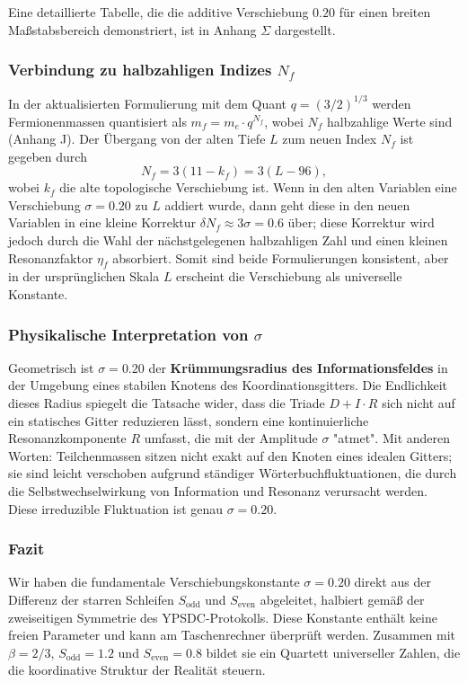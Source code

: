 \documentclass[12pt,a4paper]{article}
\begin{document}
	Eine detaillierte Tabelle, die die additive Verschiebung \(0.20\) für einen breiten Maßstabsbereich demonstriert, ist in Anhang \(\Sigma\) dargestellt.
	
	\subsubsection{Verbindung zu halbzahligen Indizes \(N_f\)}
	
	In der aktualisierten Formulierung mit dem Quant \(q = (3/2)^{1/3}\) werden Fermionenmassen quantisiert als \(m_f = m_e \cdot q^{N_f}\), wobei \(N_f\) halbzahlige Werte sind (Anhang J). Der Übergang von der alten Tiefe \(L\) zum neuen Index \(N_f\) ist gegeben durch
	\[
	N_f = 3(11 - k_f) = 3(L - 96),
	\]
	wobei \(k_f\) die alte topologische Verschiebung ist. Wenn in den alten Variablen eine Verschiebung \(\sigma = 0.20\) zu \(L\) addiert wurde, dann geht diese in den neuen Variablen in eine kleine Korrektur \(\delta N_f \approx 3\sigma = 0.6\) über; diese Korrektur wird jedoch durch die Wahl der nächstgelegenen halbzahligen Zahl und einen kleinen Resonanzfaktor \(\eta_f\) absorbiert. Somit sind beide Formulierungen konsistent, aber in der ursprünglichen Skala \(L\) erscheint die Verschiebung als universelle Konstante.
	
	\subsubsection{Physikalische Interpretation von \(\sigma\)}
	
	Geometrisch ist \(\sigma = 0.20\) der \textbf{Krümmungsradius des Informationsfeldes} in der Umgebung eines stabilen Knotens des Koordinationsgitters. Die Endlichkeit dieses Radius spiegelt die Tatsache wider, dass die Triade \(D+I\cdot R\) sich nicht auf ein statisches Gitter reduzieren lässt, sondern eine kontinuierliche Resonanzkomponente \(R\) umfasst, die mit der Amplitude \(\sigma\) "atmet". Mit anderen Worten: Teilchenmassen sitzen nicht exakt auf den Knoten eines idealen Gitters; sie sind leicht verschoben aufgrund ständiger Wörterbuchfluktuationen, die durch die Selbstwechselwirkung von Information und Resonanz verursacht werden. Diese irreduzible Fluktuation ist genau \(\sigma = 0.20\).
	
	\subsubsection{Fazit}
	
	Wir haben die fundamentale Verschiebungskonstante \(\sigma = 0.20\) direkt aus der Differenz der starren Schleifen \(S_{\mathrm{odd}}\) und \(S_{\mathrm{even}}\) abgeleitet, halbiert gemäß der zweiseitigen Symmetrie des YPSDC-Protokolls. Diese Konstante enthält keine freien Parameter und kann am Taschenrechner überprüft werden. Zusammen mit \(\beta = 2/3\), \(S_{\mathrm{odd}} = 1.2\) und \(S_{\mathrm{even}} = 0.8\) bildet sie ein Quartett universeller Zahlen, die die koordinative Struktur der Realität steuern.
	
\end{document}
